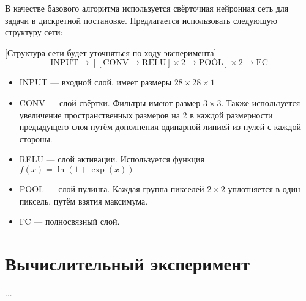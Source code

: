 \documentclass[12pt,twoside]{article}
\begin{document}
В качестве базового алгоритма используется свёрточная нейронная сеть для задачи в дискретной постановке. Предлагается использовать следующую структуру сети:

[Структура сети будет уточняться по ходу эксперимента]
$$\text{INPUT} \rightarrow [[\text{CONV} \rightarrow \text{RELU}]\times2 \rightarrow \text{POOL}]\times2 \rightarrow \text{FC}$$

\begin{itemize}
    \item INPUT --- входной слой, имеет размеры $28\times28\times1$
    \item CONV --- слой свёртки. Фильтры имеют размер $3\times3$. Также используется увеличение пространственных размеров на 2 в каждой размерности предыдущего слоя путём дополнения одинарной линией из нулей с каждой стороны.
    \item RELU --- слой активации. Используется функция $f(x)=\ln(1 + \exp(x))$
    \item POOL --- слой пулинга. Каждая группа пикселей $2\times2$ уплотняется в один пиксель, путём взятия максимума.
    \item FC --- полносвязный слой. 
\end{itemize}

\section{Вычислительный эксперимент}

...



\nocite{*}



\end{document}
